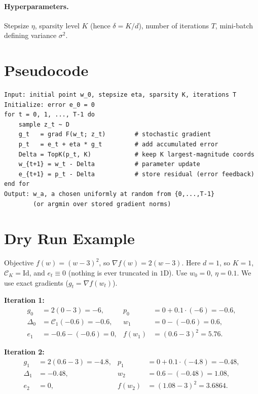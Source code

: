 \documentclass[11pt]{article}
\theoremstyle{plain}
\begin{document}
\paragraph{Hyperparameters.}
Stepsize $\eta$, sparsity level $K$ (hence $\delta=K/d$), number of iterations $T$, mini-batch defining variance $\sigma^2$.

\section*{Pseudocode}

\begin{verbatim}
Input: initial point w_0, stepsize eta, sparsity K, iterations T
Initialize: error e_0 = 0
for t = 0, 1, ..., T-1 do
    sample z_t ~ D
    g_t   = grad F(w_t; z_t)        # stochastic gradient
    p_t   = e_t + eta * g_t         # add accumulated error
    Delta = TopK(p_t, K)            # keep K largest-magnitude coords
    w_{t+1} = w_t - Delta           # parameter update
    e_{t+1} = p_t - Delta           # store residual (error feedback)
end for
Output: w_a, a chosen uniformly at random from {0,...,T-1}
        (or argmin over stored gradient norms)
\end{verbatim}

\section*{Dry Run Example}

Objective $f(w)=(w-3)^2$, so $\nabla f(w)=2(w-3)$. Here $d=1$, so $K=1$,
$\mathcal{C}_K=\mathrm{Id}$, and $e_t\equiv 0$ (nothing is ever truncated in $1$D).
Use $w_0=0$, $\eta=0.1$. We use exact gradients ($g_t=\nabla f(w_t)$).

\medskip
\noindent\textbf{Iteration 1:}
\begin{align*}
g_0 &= 2(0-3) = -6, &
p_0 &= 0 + 0.1\cdot(-6) = -0.6,\\
\Delta_0 &= \mathcal{C}_1(-0.6) = -0.6, &
w_1 &= 0 - (-0.6) = 0.6,\\
e_1 &= -0.6-(-0.6)=0, &
f(w_1) &= (0.6-3)^2 = 5.76 .
\end{align*}

\noindent\textbf{Iteration 2:}
\begin{align*}
g_1 &= 2(0.6-3) = -4.8, &
p_1 &= 0 + 0.1\cdot(-4.8) = -0.48,\\
\Delta_1 &= -0.48, &
w_2 &= 0.6 - (-0.48) = 1.08,\\
e_2 &= 0, &
f(w_2) &= (1.08-3)^2 = 3.6864 .
\end{align*}
\end{document}
